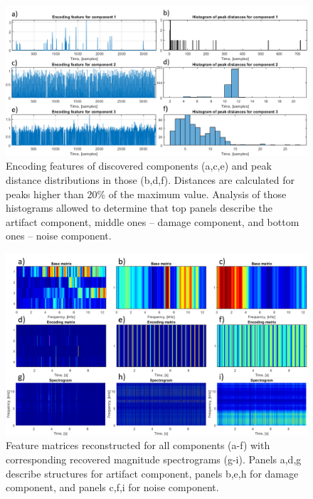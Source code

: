 \documentclass[3p,times]{elsarticle}
\begin{document}
\begin{figure}[ht!]
\centering
\includegraphics[width=\textwidth]{figs/hist.png}
\caption{Encoding features of discovered components (a,c,e) and peak distance distributions in those (b,d,f). Distances are calculated for peaks higher than 20\% of the maximum value. Analysis of those histograms allowed to determine that top panels describe the artifact component, middle ones -- damage component, and bottom ones -- noise component.}
\label{fig:NMF_hist}
\end{figure}



\begin{figure}[ht!]
\centering
\includegraphics[width=.9\textwidth]{figs/res.png}
\caption{Feature matrices reconstructed for all components (a-f) with corresponding recovered magnitude spectrograms (g-i). Panels a,d,g describe structures for artifact component, panels b,e,h for damage component, and panels c,f,i for noise component.}
\label{fig:NMF_result}
\end{figure}
\end{document}
